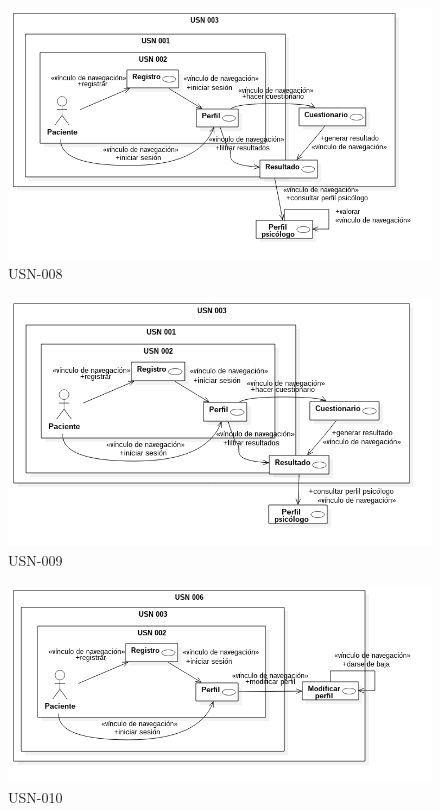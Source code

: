\begin{figure}[htbp] 
    \centering
    \includegraphics[width=1\textwidth]{figuras/usn/usn008.png}
    \caption{USN-008}
    \label{fig:usn-008}
\end{figure}	

\begin{figure}[htbp] 
    \centering
    \includegraphics[width=1\textwidth]{figuras/usn/usn009.png}
    \caption{USN-009}
    \label{fig:usn-009}
\end{figure}	

\begin{figure}[htbp] 
    \centering
    \includegraphics[width=1\textwidth]{figuras/usn/usn010.png}
    \caption{USN-010}
    \label{fig:usn-010}
\end{figure}	

